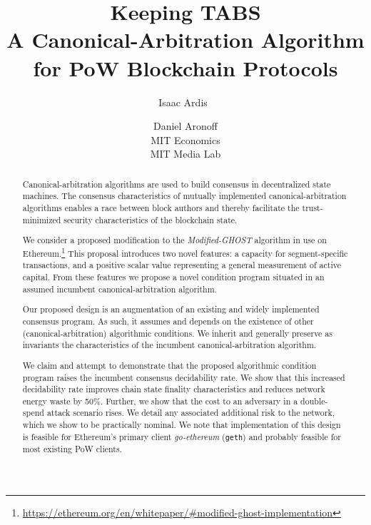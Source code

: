 \documentclass[11pt]{article}
\title{\textbf{Keeping TABS}\\
\small{A Canonical-Arbitration Algorithm for \mghost PoW Blockchain Protocols}}
\author{Isaac Ardis\
\and Daniel Aronoff\\\small{MIT Economics}\\\small{MIT Media Lab}}
\theoremstyle{plain}
\newcommand{\mghost}{\textit{Modified-GHOST }}
\begin{document}

\maketitle
\begin{abstract}

Canonical-arbitration algorithms are used to build consensus in decentralized
state machines.
The consensus characteristics of mutually implemented canonical-arbitration
algorithms enables a race between block authors and thereby facilitate
the trust-minimized security characteristics of the blockchain state.

We consider a proposed modification to the \mghost algorithm in use on
Ethereum.\footnote{\url{https://ethereum.org/en/whitepaper/#modified-ghost-implementation}}
This proposal introduces two novel features: a capacity for segment-specific
transactions, and a positive scalar value representing a general measurement of
active capital.
From these features we propose a novel condition program situated in an assumed
incumbent canonical-arbitration algorithm.

Our proposed design is an augmentation of an existing and widely implemented consensus program.
As such, it assumes and depends on the existence of other (canonical-arbitration)
algorithmic conditions.
We inherit and generally preserve as invariants the characteristics of the incumbent canonical-arbitration algorithm.

We claim and attempt to demonstrate that the proposed algorithmic condition
program raises the incumbent consensus decidability rate.
We show that this increased decidability rate improves chain state finality
characteristics and reduces network energy waste by 50\%.
Further, we show that the cost to an adversary in a double-spend attack scenario rises.
We detail any associated additional risk to the network, which we show to
be practically nominal.
We note that implementation of this design is feasible for Ethereum's
primary client \textit{go-ethereum} (\texttt{geth}) and probably feasible for
most existing PoW clients.

\end{abstract}

\pagebreak
\end{document}
